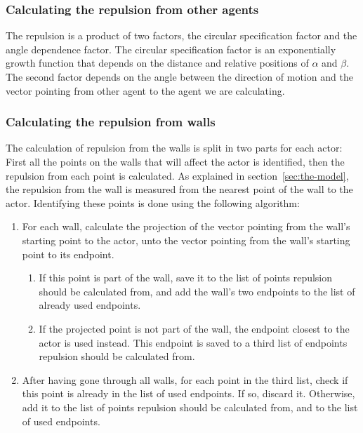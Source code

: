 \subsubsection{Calculating the repulsion from other agents}
The repulsion is a product of two factors, the circular specification factor and
the angle dependence factor. The circular specification factor is an exponentially
growth function that depends on the distance and relative positions of
$ \alpha $ and $ \beta $.  The second factor depends on the angle between
the direction of motion and the vector pointing from other agent to the agent 
we are calculating.
 
 
\subsubsection{Calculating the repulsion from walls}
The calculation of repulsion from the walls is split in two parts for each 
actor: First all the points on the walls that will affect the actor is 
identified, then the repulsion from each point is calculated. As explained in 
section~\ref{sec:the-model}, the repulsion from the wall is measured from the 
nearest point of the wall to the actor. Identifying these points is done using 
the following algorithm:

\begin{enumerate}
    \item For each wall, calculate the projection of the vector pointing from 
        the wall's starting point to the actor, unto the vector pointing from 
        the wall's starting point to its endpoint.
        \begin{enumerate}
            \item If this point is part of the wall, save it to the list of points 
                repulsion should be calculated from, and add the wall's two endpoints 
                to the list of already used endpoints.

            \item If the projected point is not part of the wall, the endpoint closest 
                to the actor is used instead. This endpoint is saved to a 
                third list of endpoints repulsion should be calculated from.
        \end{enumerate}

    \item After having gone through all walls, for each point in the third 
        list, check if this point is already in the list of used endpoints. If 
        so, discard it. Otherwise, add it to the list of points repulsion 
        should be calculated from, and to the list of used endpoints.
\end{enumerate}


